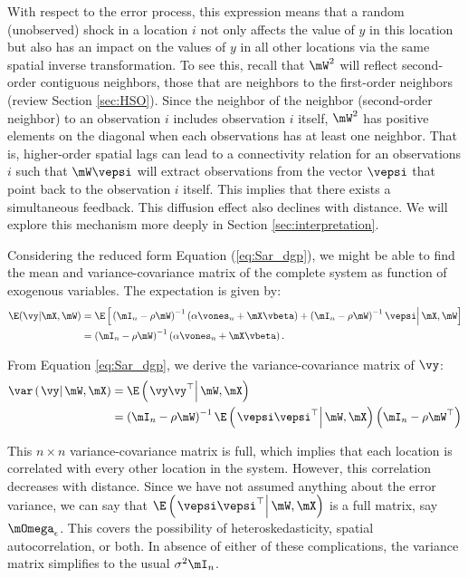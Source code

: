 \documentclass[english,12pt]{book}\usepackage[]{graphicx}\usepackage[]{xcolor}
\begin{document}
With respect to the error process, this expression means that a random (unobserved) shock in a location $i$ not only affects the value of $y$ in this location but also has an impact on the values of $y$ in all other locations via the same spatial inverse transformation. To see this, recall that $\mW^2$ will reflect second-order contiguous neighbors, those that are neighbors to the first-order neighbors (review Section \ref{sec:HSO}). Since the neighbor of the neighbor (second-order neighbor) to an observation $i$ includes observation $i$ itself, $\mW^2$ has positive elements on the diagonal when each observations has at least one neighbor. That is, higher-order spatial lags can lead to a connectivity relation for an observations $i$ such that $\mW\vepsi$ will extract observations from the vector $\vepsi$ that point back to the observation $i$ itself. This implies that there exists a simultaneous feedback. This diffusion effect also declines with distance. We will explore this mechanism more deeply in Section \ref{sec:interpretation}.

Considering the reduced form Equation (\ref{eq:Sar_dgp}), we might be able to find the mean and variance-covariance matrix of the complete system as function of exogenous variables. The expectation is given by:
\begin{equation}\label{eq:expected_value_slm}
  \begin{aligned}
\E(\vy|\mX,\mW) & = \E\left[\left.\left(\mI_n - \rho \mW\right)^{-1}\left(\alpha \vones_n + \mX\vbeta\right) + \left(\mI_n - \rho \mW\right)^{-1}\vepsi\right|\mX,\mW\right] \\
                & = \left(\mI_n - \rho \mW\right)^{-1}\left(\alpha \vones_n + \mX\vbeta\right).
\end{aligned}
\end{equation}

From Equation \eqref{eq:Sar_dgp}, we derive the variance-covariance matrix of $\vy$:
\begin{equation*}
  \begin{aligned}
    \var\left(\left.\vy\right|\mW, \mX\right) & = \E\left(\left.\vy\vy^\top\right|\mW,\mX\right) \\ 
                               & = \left(\mI_n - \rho\mW\right)^{-1}\E\left(\left.\vepsi\vepsi^\top\right|\mW, \mX\right)\left(\mI_n- \rho\mW^\top\right)
  \end{aligned}
\end{equation*}

This $n\times n$ variance-covariance matrix is full, which implies that each location is correlated with every other location in the system. However, this correlation decreases with distance. Since we have not assumed anything about the error variance, we can say that $\E\left(\left.\vepsi\vepsi^\top\right|\mW, \mX\right)$ is a full matrix, say $\mOmega_{\epsilon}$. This covers the possibility of heteroskedasticity, spatial autocorrelation, or both. In absence of either of these complications, the variance matrix simplifies to the usual $\sigma^2\mI_n$.
\end{document}
